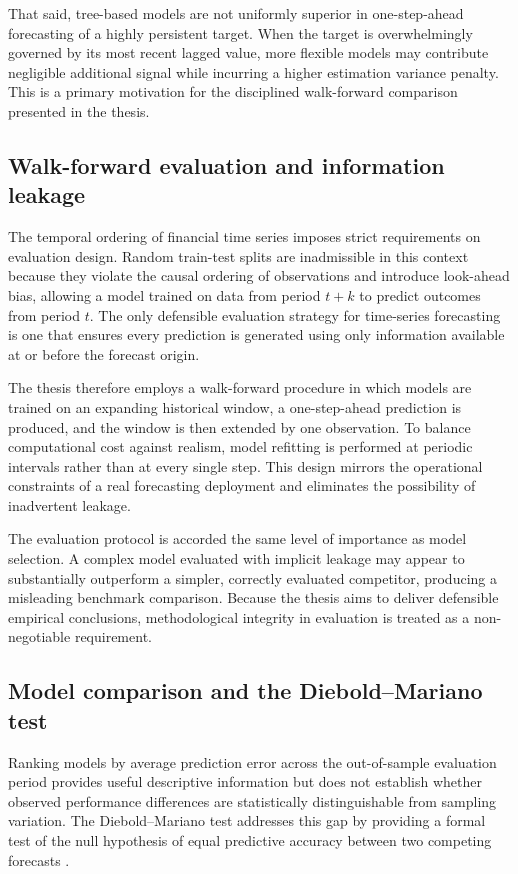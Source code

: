 That said, tree-based models are not uniformly superior in one-step-ahead forecasting of a highly persistent target. When the target is overwhelmingly governed by its most recent lagged value, more flexible models may contribute negligible additional signal while incurring a higher estimation variance penalty. This is a primary motivation for the disciplined walk-forward comparison presented in the thesis.

\subsection{Walk-forward evaluation and information leakage}

The temporal ordering of financial time series imposes strict requirements on evaluation design. Random train-test splits are inadmissible in this context because they violate the causal ordering of observations and introduce look-ahead bias, allowing a model trained on data from period $t + k$ to predict outcomes from period $t$. The only defensible evaluation strategy for time-series forecasting is one that ensures every prediction is generated using only information available at or before the forecast origin.

The thesis therefore employs a walk-forward procedure in which models are trained on an expanding historical window, a one-step-ahead prediction is produced, and the window is then extended by one observation. To balance computational cost against realism, model refitting is performed at periodic intervals rather than at every single step. This design mirrors the operational constraints of a real forecasting deployment and eliminates the possibility of inadvertent leakage.

The evaluation protocol is accorded the same level of importance as model selection. A complex model evaluated with implicit leakage may appear to substantially outperform a simpler, correctly evaluated competitor, producing a misleading benchmark comparison. Because the thesis aims to deliver defensible empirical conclusions, methodological integrity in evaluation is treated as a non-negotiable requirement.

\subsection{Model comparison and the Diebold--Mariano test}

Ranking models by average prediction error across the out-of-sample evaluation period provides useful descriptive information but does not establish whether observed performance differences are statistically distinguishable from sampling variation. The Diebold--Mariano test addresses this gap by providing a formal test of the null hypothesis of equal predictive accuracy between two competing forecasts \cite{diebold1995}.

